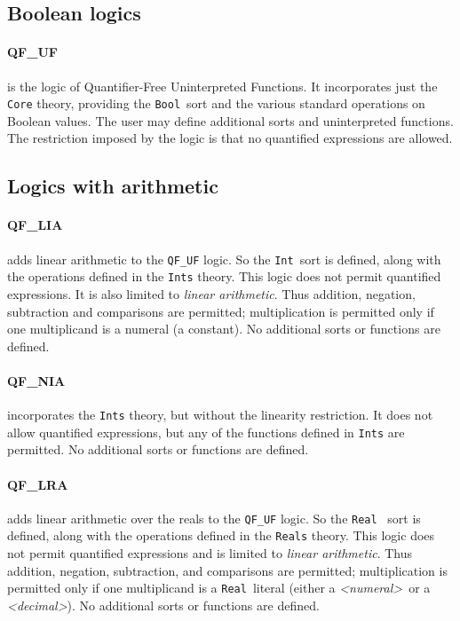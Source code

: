 \documentclass[12pt,oneside]{report}
\newcommand{\numeral}{{\it <numeral>}}
\newcommand{\decimal}{{\it <decimal>}}
\newcommand{\Bool}{{\tt Bool}}
\newcommand{\Int}{{\tt Int}}
\newcommand{\Real}{{\tt Real}}
\begin{document}


\subsection{Boolean logics}

\paragraph{QF\_UF} is the logic of Quantifier-Free Uninterpreted Functions.
It incorporates just the {\tt Core} theory, providing the \Bool\ sort and
the various standard operations on Boolean values. The user may define
additional sorts and uninterpreted functions. 
The restriction imposed by the logic is that no quantified expressions
are allowed.

\subsection{Logics with arithmetic}

\paragraph{QF\_LIA} adds linear arithmetic to the {\tt QF\_UF} logic.  So the 
\Int~sort is defined, along with the operations defined in the {\tt Ints} theory.
This logic does not permit quantified expressions.  It is also limited to 
{\it linear arithmetic}. Thus addition, negation, subtraction and comparisons are permitted;
multiplication is permitted only if one multiplicand is a numeral (a constant).
 No additional sorts or functions are defined.
 

 
\paragraph{QF\_NIA} incorporates the {\tt Ints} theory, but without the linearity restriction.
It does not allow quantified expressions, but any of the functions defined in {\tt Ints}
are permitted. No additional sorts or functions are defined.

\paragraph{QF\_LRA} adds linear arithmetic over the reals to the {\tt QF\_UF} logic.  So the \Real~
sort is defined, along with the operations defined in the {\tt Reals} theory.
This logic does not permit quantified expressions and is limited to 
{\it linear arithmetic}. Thus addition, negation, subtraction, and comparisons are permitted;
multiplication is permitted only if one multiplicand is a \Real~literal (either a 
\numeral~or a \decimal). No additional sorts or functions are defined.
\end{document}
